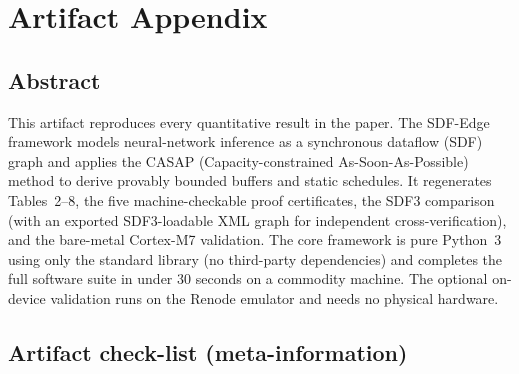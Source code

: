 \documentclass[10pt]{article}
\begin{document}

\appendix
\section{Artifact Appendix}

\subsection{Abstract}

This artifact reproduces every quantitative result in the paper. The SDF-Edge
framework models neural-network inference as a synchronous dataflow (SDF) graph
and applies the CASAP (Capacity-constrained As-Soon-As-Possible) method to
derive provably bounded buffers and static schedules. It regenerates
Tables~2--8, the five machine-checkable proof certificates, the SDF3 comparison
(with an exported SDF3-loadable XML graph for independent cross-verification),
and the bare-metal Cortex-M7 validation. The core framework is pure Python~3
using only the standard library (no third-party dependencies) and completes the
full software suite in under 30 seconds on a commodity machine. The optional
on-device validation runs on the Renode emulator and needs no physical hardware.

\subsection{Artifact check-list (meta-information)}
\end{document}
